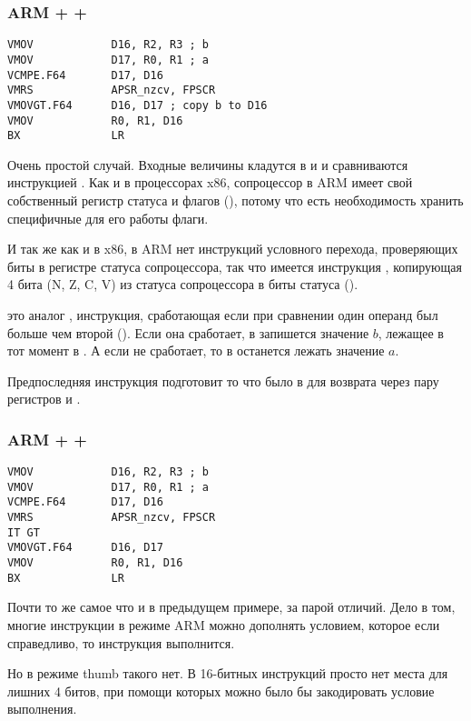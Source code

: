 ﻿\subsubsection{ARM + \OptimizingXcode + \ARMMode}

\begin{lstlisting}
VMOV            D16, R2, R3 ; b
VMOV            D17, R0, R1 ; a
VCMPE.F64       D17, D16
VMRS            APSR_nzcv, FPSCR
VMOVGT.F64      D16, D17 ; copy b to D16
VMOV            R0, R1, D16
BX              LR
\end{lstlisting}

Очень простой случай. Входные величины кладутся в  и  и сравниваются инструкцией 
.
Как и в процессорах x86, сопроцессор в ARM имеет свой собственный регистр статуса и флагов (),
потому что есть необходимость хранить специфичные для его работы флаги.

И так же как и в x86, в ARM нет инструкций условного перехода, 
проверяющих биты в регистре статуса сопроцессора, так что имеется инструкция , копирующая 4 бита
(N, Z, C, V) из статуса сопроцессора в биты  статуса ().

 это аналог , инструкция, сработающая если при сравнении один операнд 
был больше чем второй
(). Если она сработает, в  запишется значение $b$, лежащее в тот момент 
в .
А если не сработает, то в  останется лежать значение $a$.

Предпоследняя инструкция подготовит то что было в  для возврата через пару регистров  
и .

\subsubsection{ARM + \OptimizingXcode + \ThumbMode}

\begin{lstlisting}
VMOV            D16, R2, R3 ; b
VMOV            D17, R0, R1 ; a
VCMPE.F64       D17, D16
VMRS            APSR_nzcv, FPSCR
IT GT 
VMOVGT.F64      D16, D17
VMOV            R0, R1, D16
BX              LR
\end{lstlisting}

Почти то же самое что и в предыдущем примере, за парой отличий. Дело в том, многие инструкции в режиме ARM
можно дополнять условием, которое если справедливо, то инструкция выполнится.

Но в режиме thumb такого нет. В 16-битных инструкций просто нет места для лишних 4 битов, при помощи
которых можно было бы закодировать условие выполнения.


